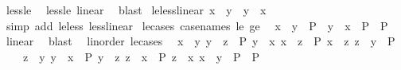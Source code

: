\begin{isabellebody}
%
\endisadelimproof
%
\isatagproof
{}\isamarkupfalse%
\ less{\isacharunderscore}{\kern0pt}le\ \isamarkupfalse%
\ less{\isacharunderscore}{\kern0pt}le\ linear\ \isamarkupfalse%
\ blast%
\endisatagproof
{\isafoldproof}%
%
\isadelimproof
\isanewline
%
\endisadelimproof
\isanewline
{}\isamarkupfalse%
\ le{\isacharunderscore}{\kern0pt}less{\isacharunderscore}{\kern0pt}linear{\isacharcolon}{\kern0pt}\ {\isachardoublequoteopen}x\ {\isasymle}\ y\ {\isasymor}\ y\ {\isacharless}{\kern0pt}\ x{\isachardoublequoteclose}\isanewline
%
\isadelimproof
%
\endisadelimproof
%
\isatagproof
{}\isamarkupfalse%
\ {\isacharparenleft}{\kern0pt}simp\ add{\isacharcolon}{\kern0pt}\ le{\isacharunderscore}{\kern0pt}less\ less{\isacharunderscore}{\kern0pt}linear{\isacharparenright}{\kern0pt}%
\endisatagproof
{\isafoldproof}%
%
\isadelimproof
\isanewline
%
\endisadelimproof
\isanewline
{}\isamarkupfalse%
\ le{\isacharunderscore}{\kern0pt}cases\ {\isacharbrackleft}{\kern0pt}case{\isacharunderscore}{\kern0pt}names\ le\ ge{\isacharbrackright}{\kern0pt}{\isacharcolon}{\kern0pt}\isanewline
\ \ {\isachardoublequoteopen}{\isacharparenleft}{\kern0pt}x\ {\isasymle}\ y\ {\isasymLongrightarrow}\ P{\isacharparenright}{\kern0pt}\ {\isasymLongrightarrow}\ {\isacharparenleft}{\kern0pt}y\ {\isasymle}\ x\ {\isasymLongrightarrow}\ P{\isacharparenright}{\kern0pt}\ {\isasymLongrightarrow}\ P{\isachardoublequoteclose}\isanewline
%
\isadelimproof
%
\endisadelimproof
%
\isatagproof
{}\isamarkupfalse%
\ linear\ \isamarkupfalse%
\ blast%
\endisatagproof
{\isafoldproof}%
%
\isadelimproof
\isanewline
%
\endisadelimproof
\isanewline
{}\isamarkupfalse%
\ {\isacharparenleft}{\kern0pt}\ linorder{\isacharparenright}{\kern0pt}\ le{\isacharunderscore}{\kern0pt}cases{}{\isacharcolon}{\kern0pt}\isanewline
\ \ {\isachardoublequoteopen}{\isasymlbrakk}{\isasymlbrakk}x\ {\isasymle}\ y{\isacharsemicolon}{\kern0pt}\ y\ {\isasymle}\ z{\isasymrbrakk}\ {\isasymLongrightarrow}\ P{\isacharsemicolon}{\kern0pt}\ {\isasymlbrakk}y\ {\isasymle}\ x{\isacharsemicolon}{\kern0pt}\ x\ {\isasymle}\ z{\isasymrbrakk}\ {\isasymLongrightarrow}\ P{\isacharsemicolon}{\kern0pt}\ {\isasymlbrakk}x\ {\isasymle}\ z{\isacharsemicolon}{\kern0pt}\ z\ {\isasymle}\ y{\isasymrbrakk}\ {\isasymLongrightarrow}\ P{\isacharsemicolon}{\kern0pt}\isanewline
\ \ \ \ {\isasymlbrakk}z\ {\isasymle}\ y{\isacharsemicolon}{\kern0pt}\ y\ {\isasymle}\ x{\isasymrbrakk}\ {\isasymLongrightarrow}\ P{\isacharsemicolon}{\kern0pt}\ {\isasymlbrakk}y\ {\isasymle}\ z{\isacharsemicolon}{\kern0pt}\ z\ {\isasymle}\ x{\isasymrbrakk}\ {\isasymLongrightarrow}\ P{\isacharsemicolon}{\kern0pt}\ {\isasymlbrakk}z\ {\isasymle}\ x{\isacharsemicolon}{\kern0pt}\ x\ {\isasymle}\ y{\isasymrbrakk}\ {\isasymLongrightarrow}\ P{\isasymrbrakk}\ {\isasymLongrightarrow}\ P{\isachardoublequoteclose}\isanewline

\end{isabellebody}
